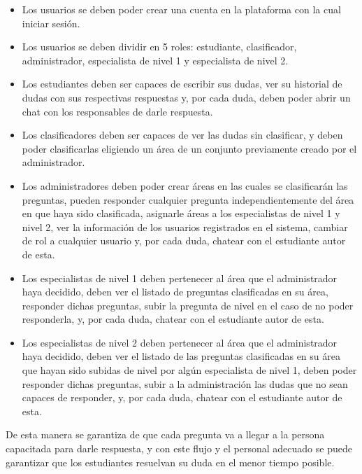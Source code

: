 \begin{itemize}
	\item Los usuarios se deben poder crear una cuenta en la plataforma con la cual iniciar sesión.
	
	\item Los usuarios se deben dividir en 5 roles: estudiante, clasificador, administrador, especialista de nivel 1 y especialista de nivel 2.
	
	\item Los estudiantes deben ser capaces de escribir sus dudas, ver su historial de dudas con sus respectivas respuestas y, por cada duda, deben poder abrir un chat con los responsables de darle respuesta.
	
	\item Los clasificadores deben ser capaces de ver las dudas sin clasificar, y deben poder clasificarlas eligiendo un área de un conjunto previamente creado por el administrador.
	
	\item Los administradores deben poder crear áreas en las cuales se clasificarán las preguntas, pueden responder cualquier pregunta independientemente del área en que haya sido clasificada, asignarle áreas a los especialistas de nivel 1 y nivel 2, ver la información de los usuarios registrados en el sistema, cambiar de rol a cualquier usuario y, por cada duda, chatear con el estudiante autor de esta.
	
	\item Los especialistas de nivel 1 deben pertenecer al área que el administrador haya decidido, deben ver el listado de preguntas clasificadas en su área, responder dichas preguntas, subir la pregunta de nivel en el caso de no poder responderla, y, por cada duda, chatear con el estudiante autor de esta.
	
	\item Los especialistas de nivel 2 deben pertenecer al área que el administrador haya decidido, deben ver el listado de las preguntas clasificadas en su área que hayan sido subidas de nivel por algún especialista de nivel 1, deben poder responder dichas preguntas, subir a la administración las dudas que no sean capaces de responder, y, por cada duda, chatear con el estudiante autor de esta.
\end{itemize}

De esta manera se garantiza de que cada pregunta va a llegar a la persona capacitada para darle respuesta, y con este flujo y el personal adecuado se puede garantizar que los estudiantes resuelvan su duda en el menor tiempo posible.